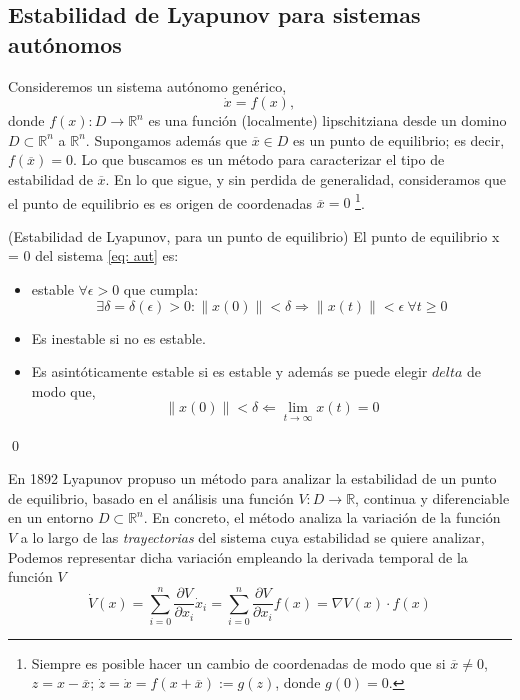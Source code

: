 \subsection{Estabilidad de Lyapunov para sistemas autónomos}
Consideremos un sistema autónomo genérico,
\begin{equation}\label{eq: aut}
\dot x = f(x),
\end{equation}
donde $f(x): D\rightarrow \mathbb{R}^n$ es una función (localmente) lipschitziana desde un domino $D \subset \mathbb{R}^n$ a $\mathbb{R}^n$. Supongamos además que $\overline x \in D$ es un punto de equilibrio; es decir, $f(\overline x) = 0$. Lo que buscamos es un método para caracterizar el tipo de estabilidad de $\overline x$. En lo que sigue, y sin perdida de generalidad, consideramos que el punto de equilibrio es es origen de coordenadas $\overline x = 0$ \footnote{Siempre es posible hacer un cambio de coordenadas de modo que si $\overline x \neq 0$, $z = x-\overline x$; $\dot z = \dot x = f(x+\overline x) := g(z)$, donde $g(0)=0$.}.

\begin{definition} (Estabilidad de Lyapunov, para un punto de equilibrio)\label{def: est}
El punto de equilibrio x = 0 del sistema \ref{eq: aut} es:
\begin{itemize}
\item estable $\forall \epsilon > 0$ que cumpla:
\begin{equation*}
 \exists \delta =\delta(\epsilon)>0: \| x(0) \| < \delta \Rightarrow \| x(t)\| < \epsilon \ \forall t \ge 0
\end{equation*}
 
 \item Es inestable si no es estable.
 \item Es asintóticamente estable si es estable y además se puede elegir $delta$ de modo que,
\begin{equation*}
\| x(0)\| < \delta \Leftarrow \lim_{t \to \infty} x(t) = 0
\end{equation*}
\end{itemize}
\qed
\end{definition}

En 1892 Lyapunov propuso un método para analizar la estabilidad de un punto de equilibrio, basado en el análisis  una función $V:D\to \mathbb{R}$, continua y diferenciable en un entorno $D \subset \mathbb{R}^n$. En concreto, el método analiza la variación de la función $V$ a lo largo de las \emph{trayectorias} del sistema cuya estabilidad se quiere analizar, Podemos representar dicha variación empleando la derivada temporal de la función $V$
\begin{equation} \label{eq: dlyap}
\dot V(x) = \sum_{i=0}^{n}\frac{\partial V}{\partial x_i} \dot x_i = \sum_{i=0}^{n}\frac{\partial V}{\partial x_i} f(x) = \nabla V(x)\cdot f(x)
\end{equation}

